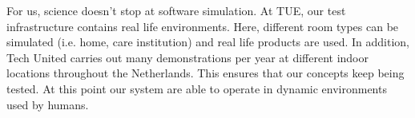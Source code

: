 For us, science doesn’t stop at software simulation. At TUE, our test infrastructure contains real life environments. Here, different room types can be simulated (i.e. home, care institution) and real life products are used. In addition, Tech United carries out many demonstrations per year at different indoor locations throughout the Netherlands. This ensures that our concepts keep being tested. At this point our system are able to operate in dynamic environments used by humans. 